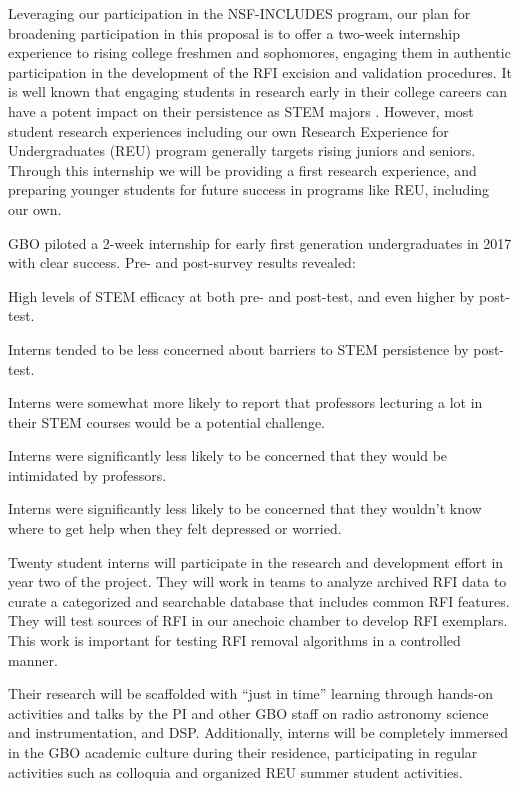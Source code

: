 \documentclass[10pt]{myNSF}
\begin{document}
Leveraging our participation in the NSF-INCLUDES program, our plan for
broadening participation in this proposal is to offer a two-week
internship experience to rising college freshmen and sophomores,
engaging them in authentic participation in the development of the RFI
excision and validation procedures.  It is well known that engaging
students in research early in their college careers can have a potent
impact on their persistence as STEM majors
\citep[e.g.][]{lw91,hfb+13}.  However, most student research
experiences including our own Research Experience for Undergraduates
(REU) program generally targets rising juniors and seniors. Through
this internship we will be providing a first research experience, and
preparing younger students for future success in programs like REU,
including our own.

GBO piloted a 2-week internship for early first generation
undergraduates in 2017 with clear success.  Pre- and post-survey
results revealed:
\begin{itemize*}
\vspace{-1.0em}
\item{High levels of STEM efficacy at both pre- and post-test, and
  even higher by post-test.}
\item{Interns tended to be less concerned about barriers to STEM
  persistence by post-test.}
\item{Interns were somewhat more likely to report that professors
  lecturing a lot in their STEM courses would be a potential
  challenge.}
\item{Interns were significantly less likely to be concerned that they
  would be intimidated by professors.}
\item{Interns were significantly less likely to be concerned that they
  wouldn't know where to get help when they felt depressed or
  worried.}
\end{itemize*}
\vspace{-1.0em}

 Twenty student interns will
participate in the research and development effort in year two of the
project.  They will work in teams to analyze archived RFI data to
curate a categorized and searchable database that includes common RFI
features.  They will test sources of RFI in our anechoic chamber to
develop RFI exemplars. This work is important for testing RFI removal
algorithms in a controlled manner.

Their research will be scaffolded with ``just in time'' learning
through hands-on activities and talks by the PI and other GBO staff on
radio astronomy science and instrumentation, and DSP.  Additionally,
interns will be completely immersed in the GBO academic culture during
their residence, participating in regular activities such as colloquia
and organized REU summer student activities.
\end{document}
